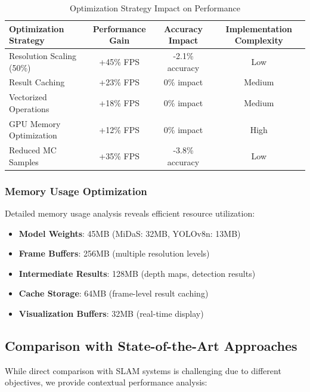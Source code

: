 \documentclass[10pt]{article}
\begin{document}
\begin{table}[ht]
\centering
\caption{Optimization Strategy Impact on Performance}
\label{tab:optimization_impact}
\begin{tabular}{@{}lccc@{}}
\toprule
\textbf{Optimization Strategy} & \textbf{Performance Gain} & \textbf{Accuracy Impact} & \textbf{Implementation Complexity} \\
\midrule
Resolution Scaling (50\%) & +45\% FPS & -2.1\% accuracy & Low \\
Result Caching & +23\% FPS & 0\% impact & Medium \\
Vectorized Operations & +18\% FPS & 0\% impact & Medium \\
GPU Memory Optimization & +12\% FPS & 0\% impact & High \\
Reduced MC Samples & +35\% FPS & -3.8\% accuracy & Low \\
\bottomrule
\end{tabular}
\end{table}

\subsubsection{Memory Usage Optimization}

Detailed memory usage analysis reveals efficient resource utilization:

\begin{itemize}
\item \textbf{Model Weights}: 45MB (MiDaS: 32MB, YOLOv8n: 13MB)
\item \textbf{Frame Buffers}: 256MB (multiple resolution levels)
\item \textbf{Intermediate Results}: 128MB (depth maps, detection results)
\item \textbf{Cache Storage}: 64MB (frame-level result caching)
\item \textbf{Visualization Buffers}: 32MB (real-time display)
\end{itemize}

\subsection{Comparison with State-of-the-Art Approaches}

While direct comparison with SLAM systems is challenging due to different objectives, we provide contextual performance analysis:
\end{document}
